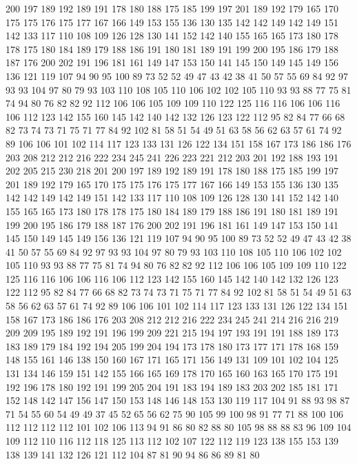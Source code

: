 200 197 189 192 189 191 178 180 188 175 185 199 197 201 189 192 179 165 170 175
175 176 175 177 167 166 149 153 155 136 130 135 142 142 149 142 149 151 142 133
117 110 108 109 126 128 130 141 152 142 140 155 165 165 173 180 178 178 175 180
184 189 179 188 186 191 180 181 189 191 199 200 195 186 179 188 187 176 200 202
191 196 181 161 149 147 153 150 141 145 150 149 145 149 156 136 121 119 107 94
90 95 100 89 73 52 52 49 47 43 42 38 41 50 57 55 69 84 92 97
93 93 104 97 80 79 93 103 110 108 105 110 106 102 102 105 110 93 93 88
77 75 81 74 94 80 76 82 82 92 112 106 106 105 109 109 110 122 125 116
116 106 106 116 106 112 123 142 155 160 145 142 140 142 132 126 123 122 112 95
82 84 77 66 68 82 73 74 73 71 75 71 77 84 92 102 81 58 51 54
49 51 63 58 56 62 63 57 61 74 92 89 106 106 101 102 114 117 123 133
131 126 122 134 151 158 167 173 186 186 176 203 208 212 212 216 222 234 245 241
226 223 221 212 203 201 192 188 193 191 202 205 215 230 218 201 200 197 189 192
189 191 178 180 188 175 185 199 197 201 189 192 179 165 170 175 175 176 175 177
167 166 149 153 155 136 130 135 142 142 149 142 149 151 142 133 117 110 108 109
126 128 130 141 152 142 140 155 165 165 173 180 178 178 175 180 184 189 179 188
186 191 180 181 189 191 199 200 195 186 179 188 187 176 200 202 191 196 181 161
149 147 153 150 141 145 150 149 145 149 156 136 121 119 107 94 90 95 100 89
73 52 52 49 47 43 42 38 41 50 57 55 69 84 92 97 93 93 104 97
80 79 93 103 110 108 105 110 106 102 102 105 110 93 93 88 77 75 81 74
94 80 76 82 82 92 112 106 106 105 109 109 110 122 125 116 116 106 106 116
106 112 123 142 155 160 145 142 140 142 132 126 123 122 112 95 82 84 77 66
68 82 73 74 73 71 75 71 77 84 92 102 81 58 51 54 49 51 63 58
56 62 63 57 61 74 92 89 106 106 101 102 114 117 123 133 131 126 122 134
151 158 167 173 186 186 176 203 208 212 212 216 222 234 245 241 214 216 216 219
209 209 195 189 192 191 196 199 209 221 215 194 197 193 191 191 188 189 173 183
189 179 184 192 194 205 199 204 194 173 178 180 173 177 171 178 168 159 148 155
161 146 138 150 160 167 171 165 171 156 149 131 109 101 102 104 125 131 134 146
159 151 142 155 166 165 169 178 170 165 160 163 165 170 175 191 192 196 178 180
192 191 199 205 204 191 183 194 189 183 203 202 185 181 171 152 148 142 147 156
147 150 153 148 146 148 153 130 119 117 104 91 88 93 98 87 71 54 55 60
54 49 49 37 45 52 65 56 62 75 90 105 99 100 98 91 77 71 88 100
106 112 112 112 112 101 102 106 113 94 91 86 80 82 88 80 105 98 88 88
83 96 109 104 109 112 110 116 112 118 125 113 112 102 107 122 112 119 123 138
155 153 139 138 139 141 132 126 121 112 104 87 81 90 94 86 86 89 81 80
